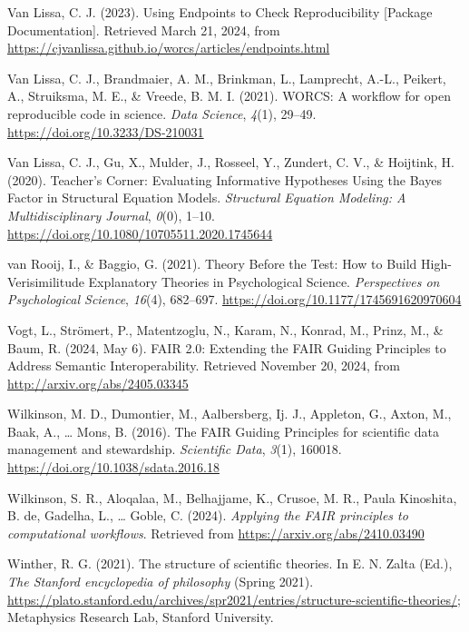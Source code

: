 \documentclass[
  man,floatsintext]{apa6}
\newlength{\cslhangindent}
\newenvironment{CSLReferences}[2] %
 {\begin{list}{}{%
  \setlength{\itemindent}{0pt}
  \setlength{\leftmargin}{0pt}
  \setlength{\parsep}{0pt}
  \ifodd #1
   \setlength{\leftmargin}{\cslhangindent}
   \setlength{\itemindent}{-1\cslhangindent}
  \fi
  \setlength{\itemsep}{#2\baselineskip}}}
 {\end{list}}
\begin{document}
\begin{CSLReferences}{1}{0}
Van Lissa, C. J. (2023). Using {Endpoints} to {Check Reproducibility} {[}Package Documentation{]}. Retrieved March 21, 2024, from \url{https://cjvanlissa.github.io/worcs/articles/endpoints.html}

Van Lissa, C. J., Brandmaier, A. M., Brinkman, L., Lamprecht, A.-L., Peikert, A., Struiksma, M. E., \& Vreede, B. M. I. (2021). {WORCS}: {A} workflow for open reproducible code in science. \emph{Data Science}, \emph{4}(1), 29--49. \url{https://doi.org/10.3233/DS-210031}

Van Lissa, C. J., Gu, X., Mulder, J., Rosseel, Y., Zundert, C. V., \& Hoijtink, H. (2020). Teacher's {Corner}: {Evaluating Informative Hypotheses Using} the {Bayes Factor} in {Structural Equation Models}. \emph{Structural Equation Modeling: A Multidisciplinary Journal}, \emph{0}(0), 1--10. \url{https://doi.org/10.1080/10705511.2020.1745644}

van Rooij, I., \& Baggio, G. (2021). Theory {Before} the {Test}: {How} to {Build High-Verisimilitude Explanatory Theories} in {Psychological Science}. \emph{Perspectives on Psychological Science}, \emph{16}(4), 682--697. \url{https://doi.org/10.1177/1745691620970604}

Vogt, L., Strömert, P., Matentzoglu, N., Karam, N., Konrad, M., Prinz, M., \& Baum, R. (2024, May 6). {FAIR} 2.0: {Extending} the {FAIR Guiding Principles} to {Address Semantic Interoperability}. Retrieved November 20, 2024, from \url{http://arxiv.org/abs/2405.03345}

Wilkinson, M. D., Dumontier, M., Aalbersberg, Ij. J., Appleton, G., Axton, M., Baak, A., \ldots{} Mons, B. (2016). The {FAIR Guiding Principles} for scientific data management and stewardship. \emph{Scientific Data}, \emph{3}(1), 160018. \url{https://doi.org/10.1038/sdata.2016.18}

Wilkinson, S. R., Aloqalaa, M., Belhajjame, K., Crusoe, M. R., Paula Kinoshita, B. de, Gadelha, L., \ldots{} Goble, C. (2024). \emph{Applying the FAIR principles to computational workflows}. Retrieved from \url{https://arxiv.org/abs/2410.03490}

Winther, R. G. (2021). The structure of scientific theories. In E. N. Zalta (Ed.), \emph{The {Stanford} encyclopedia of philosophy} ({S}pring 2021). \url{https://plato.stanford.edu/archives/spr2021/entries/structure-scientific-theories/}; Metaphysics Research Lab, Stanford University.

\end{CSLReferences}
\end{document}

